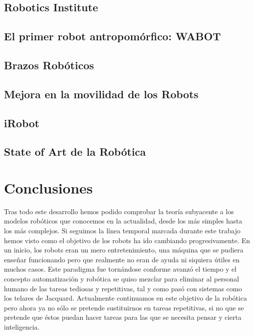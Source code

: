 \documentclass[a4paper,11pt]{article}
\begin{document}
\subsection{Robotics Institute}


\subsection{El primer robot antropomórfico: WABOT}


\subsection{Brazos Robóticos}


\subsection{Mejora en la movilidad de los Robots}


\subsection{iRobot}


\subsection{State of Art de la Robótica}


\newpage
\section{Conclusiones}
Tras todo este desarrollo hemos podido comprobar la teoría subyacente a los modelos robóticos que conocemos en la actualidad, desde los más simples hasta los más complejos. Si seguimos la línea temporal marcada durante este trabajo hemos visto como el objetivo de los robots ha ido cambiando progresivamente. En un inicio, los robots eran un mero entretenimiento, una máquina que se pudiera enseñar funcionando pero que realmente no eran de ayuda ni siquiera útiles en muchos casos. Este paradigma fue tornándose conforme avanzó el tiempo y el concepto automatización y robótica se quiso mezclar para eliminar al personal humano de las tareas tediosas y repetitivas, tal y como pasó con sistemas como los telares de Jacquard. Actualmente continuamos en este objetivo de la robótica pero ahora ya no sólo se pretende sustituirnos en tareas repetitivas, si no que se pretende que éstos puedan hacer tareas para las que se necesita pensar y cierta inteligencia.
\end{document}
